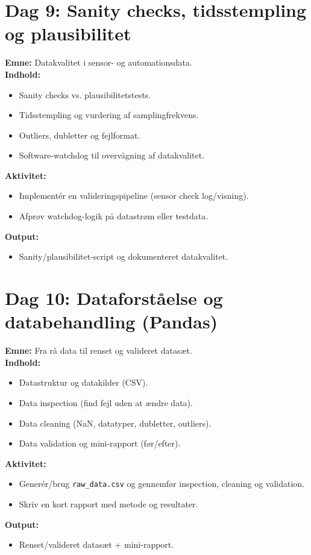 \documentclass[a4paper,11pt]{article}
\begin{document}
\section{Dag 9: Sanity checks, tidsstempling og plausibilitet}

\textbf{Emne:} Datakvalitet i sensor- og automationsdata.\\
\textbf{Indhold:}
\begin{itemize}
  \item Sanity checks vs. plausibilitetstests.
  \item Tidsstempling og vurdering af samplingfrekvens.
  \item Outliers, dubletter og fejlformat.
  \item Software-watchdog til overvågning af datakvalitet.
\end{itemize}
\textbf{Aktivitet:}
\begin{itemize}
  \item Implementér en valideringspipeline (sensor \textrightarrow{} check \textrightarrow{} log/visning).
  \item Afprøv watchdog-logik på datastrøm eller testdata.
\end{itemize}
\textbf{Output:}
\begin{itemize}
  \item Sanity/plausibilitet-script og dokumenteret datakvalitet.
\end{itemize}


\section{Dag 10: Dataforståelse og databehandling (Pandas)}

\textbf{Emne:} Fra rå data til renset og valideret datasæt.\\
\textbf{Indhold:}
\begin{itemize}
  \item Datastruktur og datakilder (CSV).
  \item Data inspection (find fejl uden at ændre data).
  \item Data cleaning (NaN, datatyper, dubletter, outliers).
  \item Data validation og mini-rapport (før/efter).
\end{itemize}
\textbf{Aktivitet:}
\begin{itemize}
  \item Generér/brug \texttt{raw\_data.csv} og gennemfør inspection, cleaning og validation.
  \item Skriv en kort rapport med metode og resultater.
\end{itemize}
\textbf{Output:}
\begin{itemize}
  \item Renset/valideret datasæt + mini-rapport.
\end{itemize}
\end{document}
